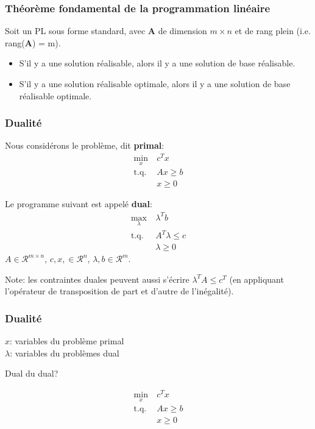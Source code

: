 \documentclass{beamer}
\def\cR{\mathcal{R}}
\def\bA{\boldsymbol{A}}
\begin{document}
\begin{frame}
	\frametitle{Théorème fondamental de la programmation linéaire}
	
	Soit un PL sous forme standard, avec $\bA$ de dimension $m \times n$ et de rang plein (i.e. rang($\bA$) = m).
	\begin{itemize}
		\item
		S'il y a une solution réalisable, alors il y a une solution de base réalisable.
		\item
		S'il y a une solution réalisable optimale, alors il y a une solution de base réalisable optimale.
	\end{itemize}

\end{frame}
\begin{frame}
	\frametitle{Dualité}
	
	Nous considérons le problème, dit {\bf primal}:
	\begin{align*}
		\min_x \ & c^T x \\
		\mbox{t.q. } & Ax \geq b \\
		& x \geq 0
	\end{align*}
	
	\mbox{}
	
	Le programme suivant est appelé {\bf dual}:
	\begin{align*}
		\max_{\lambda} \ & \lambda^T b \\
		\mbox{t.q. } & A^T \lambda \leq c \\
		& \lambda \geq 0
	\end{align*}
	$A \in \cR^{m \times n}$, $c, x, \in \cR^n$, $\lambda, b \in \cR^m$.
	
	Note: les contraintes duales peuvent aussi s'écrire $\lambda^T A \leq c^T$ (en appliquant l'opérateur de transposition de part et d'autre de l'inégalité).
	
\end{frame}

\begin{frame}
	\frametitle{Dualité}
	
	$x$: variables du problème primal\\
	$\lambda$: variables du problèmes dual
	
	\mbox{}
	
	Dual du dual?
	
	\mbox{}
	
	\begin{align*}
		\min_x \ & c^T x \\
		\mbox{t.q. } & Ax \geq b \\
		& x \geq 0
	\end{align*}
	
\end{frame}
\end{document}
